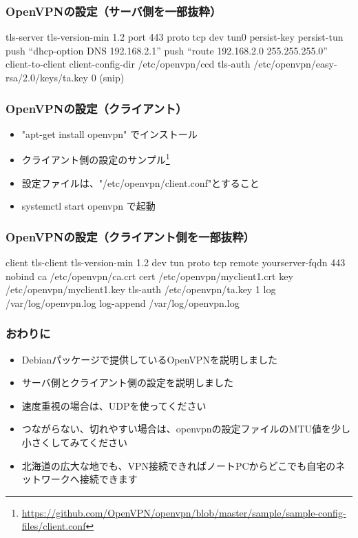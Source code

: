 \documentclass[mingoth,a4paper]{jsarticle}
\begin{document}
\subsubsection{OpenVPNの設定（サーバ側を一部抜粋）}

\begin{commandline}
tls-server
tls-version-min 1.2
port 443
proto tcp
dev tun0
persist-key
persist-tun
push ``dhcp-option DNS 192.168.2.1''
push ``route 192.168.2.0 255.255.255.0''
client-to-client
client-config-dir /etc/openvpn/ccd
tls-auth /etc/openvpn/easy-rsa/2.0/keys/ta.key 0
  (snip)  
\end{commandline}

\newpage

\subsubsection{OpenVPNの設定（クライアント）}

\begin{itemize}
\item "apt-get install openvpn" でインストール
\item クライアント側の設定のサンプル\footnote{\url{https://github.com/OpenVPN/openvpn/blob/master/sample/sample-config-files/client.conf}}
\item 設定ファイルは、"/etc/openvpn/client.conf"とすること
\item systemctl start openvpn で起動
\end{itemize}


\subsubsection{OpenVPNの設定（クライアント側を一部抜粋）}

\begin{commandline}
client
tls-client
tls-version-min 1.2
dev tun
proto tcp
remote yourserver-fqdn 443
nobind
ca /etc/openvpn/ca.crt
cert /etc/openvpn/myclient1.crt
key /etc/openvpn/myclient1.key
tls-auth /etc/openvpn/ta.key 1
log /var/log/openvpn.log
log-append /var/log/openvpn.log
\end{commandline}


\subsubsection{おわりに}

\begin{itemize}
\item Debianパッケージで提供しているOpenVPNを説明しました
\item サーバ側とクライアント側の設定を説明しました
\item 速度重視の場合は、UDPを使ってください
\item つながらない、切れやすい場合は、openvpnの設定ファイルのMTU値を少し小さくしてみてください
\item 北海道の広大な地でも、VPN接続できればノートPCからどこでも自宅のネットワークへ接続できます
\end{itemize}
\end{document}
